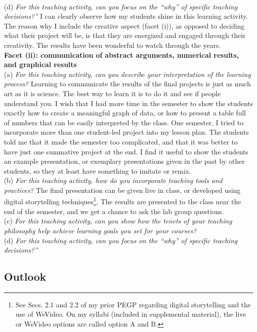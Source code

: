\documentclass[../../../main.tex]{subfiles}
\begin{document}
\\
\vspace{0.25cm}
(d) \textit{For this teaching activity, can you focus on the ``why'' of specific teaching decisions?''}  I can clearly observe how my students shine in this learning activity.  The reason why I include the creative aspect (facet (i)), as opposed to deciding what their project will be, is that they are energized and engaged through their creativity.  The results have been wonderful to watch through the years.
\\
\vspace{0.25cm}
\textbf{Facet (ii): communication of abstract arguments, numerical results, and graphical results}
\\
\vspace{0.25cm}
(a) \textit{For this teaching activity, can you describe your interpretation of the learning process?}  Learning to communicate the results of the final projects is just as much art as it is science.  The best way to learn it is to do it and see if people understand you.  I wish that I had more time in the semester to show the students exactly how to create a meaningful graph of data, or how to present a table full of numbers that can be easily interpreted by the class.  One semester, I tried to incorporate more than one student-led project into my lesson plan.  The students told me that it made the semester too complicated, and that it was better to have just one summative project at the end.  I find it useful to show the students an example presentation, or exemplary presentations given in the past by other students, so they at least have something to imitate or remix.
\\
\vspace{0.25cm}
(b) \textit{For this teaching activity, how do you incorporate teaching tools and practices?}  The final presentation can be given live in class, or developed using digital storytelling techniques\footnote{See Secs. 2.1 and 2.2 of my prior PEGP regarding digital storytelling and the use of WeVideo.  On my syllabi (included in supplemental material), the live or WeVideo options are called option A and B.}.  The results are presented to the class near the end of the semester, and we get a chance to ask the lab group questions.
\\
\vspace{0.25cm}
(c) \textit{For this teaching activity, can you show how the tenets of your teaching philosophy help achieve learning goals you
set for your courses?}
\\
\vspace{0.25cm}
(d) \textit{For this teaching activity, can you focus on the ``why'' of specific teaching decisions?''}

\subsection{Outlook}

\end{document}
